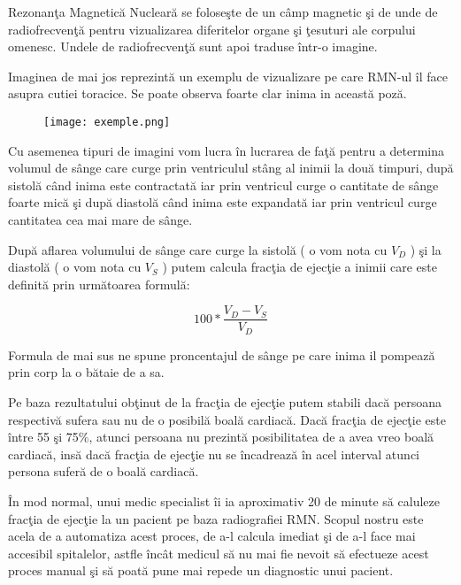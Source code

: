 Rezonan\c{t}a Magnetic\u{a} Nuclear\u{a} se folose\c{s}te de un c\^{a}mp magnetic \c{s}i de unde de radiofrecven\c{t}\u{a} pentru vizualizarea diferitelor organe \c{s}i \c{t}esuturi ale corpului omenesc. Undele de radiofrecven\c{t}\u{a} sunt apoi traduse \^{i}ntr-o imagine.
\par
Imaginea de mai jos reprezint\u{a} un exemplu de vizualizare pe care RMN-ul \^{i}l face asupra cutiei toracice. Se poate observa foarte clar inima in aceast\u{a} poz\u{a}.

\begin{figure}[h!]
  \centering
  \texttt{[image: exemple.png]}
\end{figure}

Cu asemenea tipuri de imagini vom lucra \^{i}n lucrarea de fa\c{t}\u{a} pentru a determina volumul de s\^{a}nge care curge prin ventriculul st\^{a}ng al inimii la dou\u{a} timpuri, dup\u{a} sistol\u{a} c\^{a}nd inima este contractat\u{a} iar prin ventricul curge o cantitate de s\^{a}nge foarte mic\u{a} \c{s}i dup\u{a} diastol\u{a} c\^{a}nd inima este expandat\u{a} iar prin ventricul curge cantitatea cea mai mare de s\^{a}nge.
\par
Dup\u{a} aflarea volumului de s\^{a}nge care curge la sistol\u{a} ( o vom nota cu \textbf{\textit{$V_D$}} ) \c{s}i la diastol\u{a} ( o vom nota cu \textbf{\textit{$V_S$}} ) putem calcula frac\c{t}ia de ejec\c{t}ie a inimii care este definit\u{a} prin urm\u{a}toarea formul\u{a}:

$$100 * \frac{V_D - V_S}{V_D}$$

Formula de mai sus ne spune proncentajul de s\^{a}nge pe care inima il pompeaz\u{a} prin corp la o b\u{a}taie de a sa.
\par
Pe baza rezultatului ob\c{t}inut de la frac\c{t}ia de ejec\c{t}ie putem stabili dac\u{a} persoana respectiv\u{a} sufera sau nu de o posibil\u{a} boal\u{a} cardiac\u{a}. Dac\u{a} frac\c{t}ia de ejec\c{t}ie este \^{i}ntre 55 \c{s}i 75\%, atunci persoana nu prezint\u{a} posibilitatea de a avea vreo boal\u{a} cardiac\u{a}, ins\u{a} dac\u{a} frac\c{t}ia de ejec\c{t}ie nu se \^{i}ncadreaz\u{a} \^{i}n acel interval atunci persona sufer\u{a} de o boal\u{a} cardiac\u{a}.
\par
\^{I}n mod normal, unui medic specialist \^{i}i ia aproximativ 20 de minute s\u{a} caluleze frac\c{t}ia de ejec\c{t}ie la un pacient pe baza radiografiei RMN. Scopul nostru este acela de a automatiza acest proces, de a-l calcula imediat \c{s}i de a-l face mai accesibil spitalelor, astfle \^{i}nc\^{a}t medicul s\u{a} nu mai fie nevoit s\u{a} efectueze acest proces manual \c{s}i s\u{a} poat\u{a} pune mai repede un diagnostic unui pacient.

